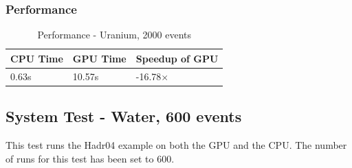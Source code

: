 \documentclass[12pt]{article}
\begin{document}
		\subsubsection{Performance}
		\begin{table}[H]
		\centering
		\caption{Performance - Uranium, 2000 events}\label{sys2Perf}
		\begin{tabular}{lll}
		\toprule
		 \bf CPU Time&  \bf GPU Time& \bf Speedup of GPU\\\midrule
		0.63s&10.57s&-16.78$\times$\\\bottomrule
		\end{tabular}
		\end{table}

\subsection{System Test - Water, 600 events}
This test runs the Hadr04 example on both the GPU and the CPU. The number of runs for this test has been set to 600.
\end{document}
